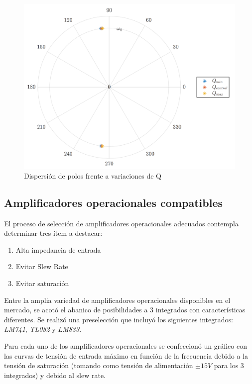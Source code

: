 \begin{figure}[H]
\centering
\includegraphics[scale=0.5]{../parte1/informe/resources/polos_sens_Q}
\caption{Dispersión de polos frente a variaciones de Q}
\label{polos_sens_Q}
\end{figure}

\subsection{Amplificadores operacionales compatibles}
El proceso de selección de amplificadores operacionales adecuados contempla determinar tres ítem a destacar:

\begin{enumerate}
\item Alta impedancia de entrada
\item Evitar Slew Rate
\item Evitar saturación
\end{enumerate}

Entre la amplia variedad de amplificadores operacionales disponibles en el mercado, se acotó el abanico de posibilidades a 3 integrados con características diferentes. Se realizó una preselección que incluyó los siguientes integrados: \emph{LM741}, \emph{TL082} y \emph{LM833}.

Para cada uno de los amplificadores operacionales se confeccionó un gráfico con las curvas de tensión de entrada máximo en función de la frecuencia debido a la tensión de saturación (tomando como tensión de alimentación $\pm 15V$ para los 3 integrados) y debido al slew rate. 

